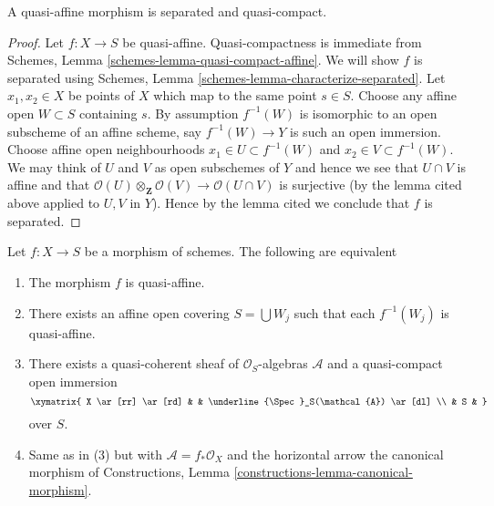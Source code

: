 \begin{lemma}
\label{lemma-quasi-affine-separated}
A quasi-affine morphism is separated and quasi-compact.
\end{lemma}

\begin{proof}
Let $f : X \to S$ be quasi-affine.
Quasi-compactness is immediate from
Schemes, Lemma \ref{schemes-lemma-quasi-compact-affine}.
We will show $f$ is separated using
Schemes, Lemma \ref{schemes-lemma-characterize-separated}. Let
$x_1, x_2 \in X$ be points of $X$ which map to the same point $s \in S$.
Choose any affine open $W \subset S$ containing $s$. By assumption
$f^{-1}(W)$ is isomorphic to an open subscheme of an affine scheme,
say $f^{-1}(W) \to Y$ is such an open immersion.
Choose affine open neighbourhoods $x_1 \in U \subset f^{-1}(W)$
and $x_2 \in V \subset f^{-1}(W)$. We may think of $U$ and $V$
as open subschemes of $Y$ and hence we see that
$U \cap V$ is affine and that
$\mathcal{O}(U) \otimes_{\mathbf{Z}} \mathcal{O}(V) \to \mathcal{O}(U \cap V)$
is surjective (by the lemma cited above applied to $U, V$ in $Y$).
Hence by the lemma cited we conclude that $f$ is separated.
\end{proof}

\begin{lemma}
\label{lemma-characterize-quasi-affine}
Let $f : X \to S$ be a morphism of schemes.
The following are equivalent
\begin{enumerate}
\item The morphism $f$ is quasi-affine.
\item There exists an affine open covering $S = \bigcup W_j$
such that each $f^{-1}(W_j)$ is quasi-affine.
\item There exists a quasi-coherent sheaf of $\mathcal{O}_S$-algebras
$\mathcal{A}$ and a quasi-compact open immersion
$$
\xymatrix{
X \ar[rr] \ar[rd] & & \underline{\Spec}_S(\mathcal{A}) \ar[dl] \\
& S &
}
$$
over $S$.
\item Same as in (3) but with $\mathcal{A} = f_*\mathcal{O}_X$
and the horizontal arrow the canonical morphism of
Constructions, Lemma \ref{constructions-lemma-canonical-morphism}.
\end{enumerate}
\end{lemma}

